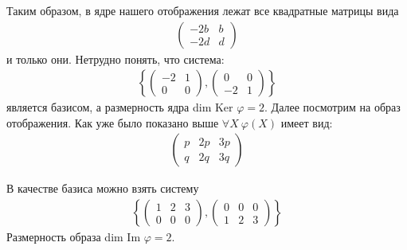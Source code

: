 \documentclass[a4paper, 12pt]{article}
\begin{document}
\begin{spacing}{1.5}
Таким образом, в ядре нашего отображения лежат все квадратные матрицы вида
\begin{align*}
\begin{pmatrix}
-2b & b \\
-2d & d
\end{pmatrix}
\end{align*}
и только они. Нетрудно понять, что система:
\begin{align*}
\left \{
\begin{pmatrix}
-2 & 1 \\
0 & 0
\end{pmatrix},
\begin{pmatrix}
0 & 0 \\
-2 & 1
\end{pmatrix}
\right \}
\end{align*}
является базисом, а размерность ядра dim Ker $\varphi = 2$. Далее посмотрим на образ отображения. Как уже было показано выше $\forall X \ \varphi(X)$ имеет вид:
\begin{align*}
\begin{pmatrix}
p & 2p & 3p \\
q & 2q & 3q
\end{pmatrix}
\end{align*}

В качестве базиса можно взять систему
\begin{align*}
\left \{
\begin{pmatrix}
1 & 2 & 3 \\
0 & 0 & 0
\end{pmatrix},
\begin{pmatrix}
0 & 0 & 0 \\
1 & 2 & 3
\end{pmatrix}
\right \}
\end{align*}
Размерность образа dim Im $\varphi = 2$.

\setlength{\leftskip}{0ex}
\setlength{\rightskip}{0ex}

\end{spacing}
\end{document}
